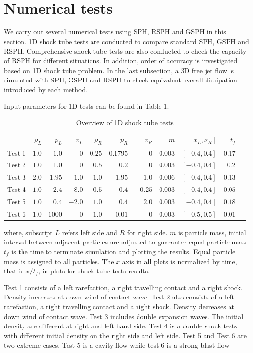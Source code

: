 \section{Numerical tests}
We carry out several numerical tests using SPH, RSPH and GSPH in this section.
1D shock tube tests are conducted to compare standard SPH, GSPH and RSPH. Comprehensive shock tube tests are also conducted to check the capacity of RSPH for different situations. In addition, order of accuracy is investigated based on 1D shock tube problem. 
In the last subsection, a 3D free jet flow is simulated with SPH, GSPH and RSPH to check equivalent overall dissipation introduced by each method.

Input parameters for 1D tests can be found in Table \ref{tab:1D-shock-input_parameters}. 
\begin{table}[htp]
\centering
      \caption{Overview of 1D shock tube tests}		
	  \begin{tabular}{lrrrrrrrrrr}
	    \hline
	          & $\rho_L$ & $p_L$ &$v_L$ & $\rho_R$ & $p_R$ &$v_R$ & $m$ & $[x_L, x_R]$ & $t_f$\\
	    \hline
	    Test 1 & $1.0$ & $1.0$ &$0$ & $0.25$ & $0.1795$ &$0$ & $0.003$  & $[-0.4, 0.4]$ & $0.17$\\
	    	Test 2 & $1.0$ & $1.0$ &$0$ & $0.5$ & $0.2$ &$0$ & $0.003$  & $[-0.4, 0.4]$ & $0.2$\\
	    	Test 3 & $2.0$ & $1.95$ &$1.0$ & $1.0$ & $1.95$ &$-1.0$  & $0.006$  & $[-0.4, 0.4]$ & $0.13$\\
	    Test 4 & $1.0$ & $2.4$ &$8.0$ & $0.5$ & $0.4$ &$-0.25$ & $0.003$  & $[-0.4, 0.4]$ & $0.05$\\
	    	Test 5 & $1.0$ & $0.4$ &$-2.0$ & $1.0$ & $0.4$ &$2.0$ & $0.003$  & $[-0.4, 0.4]$ & $0.18$\\
	    	Test 6 & $1.0$ & $1000$ &$0$ & $1.0$ & $0.01$ &$0$ & $0.003$  & $[-0.5, 0.5]$  & $0.01$\\
	    \hline
	  \end{tabular}
	  \label{tab:1D-shock-input_parameters}
\end{table}
where, subscript $L$ refers left side and $R$ for right side. $m$ is particle mass, initial interval between adjacent particles are adjusted to guarantee equal particle mass. $t_f$ is the time to terminate simulation and plotting the results. Equal particle mass is assigned to all particles. The $x$ axis in all plots is normalized by time, that is $x/t_f$, in plots for shock tube tests results.

Test 1 consists of a left rarefaction, a right travelling contact and a right shock. Density increases at down wind of contact wave.
Test 2 also consists of a left rarefaction, a right travelling contact and a right shock. Density decreases at down wind of contact wave.
Test 3 includes double expansion waves. The initial density are different at right and left hand side.
Test 4 is a double shock tests with different initial density on the right side and left side.
Test 5 and Test 6 are two extreme cases. Test 5 is a cavity flow while test 6 is a strong blast flow.

